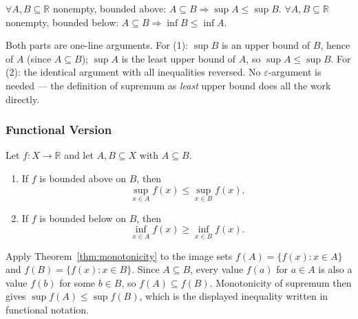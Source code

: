 \begin{remark*}
$\forall A, B \subseteq \mathbb{R}$ nonempty, bounded above:
$A \subseteq B \Rightarrow \sup A \le \sup B$.
$\forall A, B \subseteq \mathbb{R}$ nonempty, bounded below:
$A \subseteq B \Rightarrow \inf B \le \inf A$.
\end{remark*}

\begin{remark*}
Both parts are one-line arguments.
For (1): $\sup B$ is an upper bound of $B$, hence of $A$ (since $A \subseteq B$);
$\sup A$ is the least upper bound of $A$, so $\sup A \le \sup B$.
For (2): the identical argument with all inequalities reversed.
No $\varepsilon$-argument is needed — the definition of supremum as
\emph{least} upper bound does all the work directly.
\end{remark*}

\subsubsection{Functional Version}

\begin{theorem}
\label{thm:monotonicity-functions}
Let $f : X \to \mathbb{R}$ and let $A,B \subseteq X$ with $A \subseteq B$.

\begin{enumerate}
\item If $f$ is bounded above on $B$, then
\[
\sup_{x \in A} f(x)
\le
\sup_{x \in B} f(x).
\]

\item If $f$ is bounded below on $B$, then
\[
\inf_{x \in A} f(x)
\ge
\inf_{x \in B} f(x).
\]
\end{enumerate}
\end{theorem}

\begin{remark*}
Apply Theorem~\ref{thm:monotonicity} to the image sets
$f(A) = \{f(x) : x \in A\}$ and $f(B) = \{f(x) : x \in B\}$.
Since $A \subseteq B$, every value $f(a)$ for $a \in A$ is also
a value $f(b)$ for some $b \in B$, so $f(A) \subseteq f(B)$.
Monotonicity of supremum then gives $\sup f(A) \le \sup f(B)$,
which is the displayed inequality written in functional notation.
\end{remark*}


